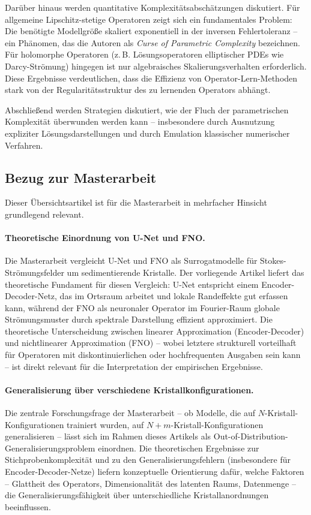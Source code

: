 \documentclass[a4paper,12pt]{article}
\begin{document}
Darüber hinaus werden quantitative Komplexit\"atsabsch\"atzungen diskutiert. Für allgemeine Lipschitz-stetige Operatoren zeigt sich ein fundamentales Problem: Die ben\"otigte Modellgröße skaliert exponentiell in der inversen Fehlertoleranz – ein Phänomen, das die Autoren als \textit{Curse of Parametric Complexity} bezeichnen. Für holomorphe Operatoren (z.\,B. Lösungsoperatoren elliptischer PDEs wie Darcy-Strömung) hingegen ist nur algebraisches Skalierungsverhalten erforderlich. Diese Ergebnisse verdeutlichen, dass die Effizienz von Operator-Lern-Methoden stark von der Regularitätsstruktur des zu lernenden Operators abhängt.

Abschließend werden Strategien diskutiert, wie der Fluch der parametrischen Komplexit\"at überwunden werden kann – insbesondere durch Ausnutzung expliziter Lösungsdarstellungen und durch Emulation klassischer numerischer Verfahren.

\subsection*{Bezug zur Masterarbeit}

Dieser Übersichtsartikel ist für die Masterarbeit in mehrfacher Hinsicht grundlegend relevant.

\paragraph{Theoretische Einordnung von U-Net und FNO.}
Die Masterarbeit vergleicht U-Net und FNO als Surrogatmodelle für Stokes-Strömungsfelder um sedimentierende Kristalle. Der vorliegende Artikel liefert das theoretische Fundament für diesen Vergleich: U-Net entspricht einem Encoder-Decoder-Netz, das im Ortsraum arbeitet und lokale Randeffekte gut erfassen kann, während der FNO als neuronaler Operator im Fourier-Raum globale Strömungsmuster durch spektrale Darstellung effizient approximiert. Die theoretische Unterscheidung zwischen linearer Approximation (Encoder-Decoder) und nichtlinearer Approximation (FNO) – wobei letztere strukturell vorteilhaft für Operatoren mit diskontinuierlichen oder hochfrequenten Ausgaben sein kann – ist direkt relevant für die Interpretation der empirischen Ergebnisse.

\paragraph{Generalisierung über verschiedene Kristallkonfigurationen.}
Die zentrale Forschungsfrage der Masterarbeit – ob Modelle, die auf $N$-Kristall-Konfigurationen trainiert wurden, auf $N{+}m$-Kristall-Konfigurationen generalisieren – lässt sich im Rahmen dieses Artikels als Out-of-Distribution-Generalisierungsproblem einordnen. Die theoretischen Ergebnisse zur Stichprobenkomplexität und zu den Generalisierungsfehlern (insbesondere für Encoder-Decoder-Netze) liefern konzeptuelle Orientierung dafür, welche Faktoren – Glattheit des Operators, Dimensionalität des latenten Raums, Datenmenge – die Generalisierungsf\"ahigkeit über unterschiedliche Kristallanordnungen beeinflussen.
\end{document}
